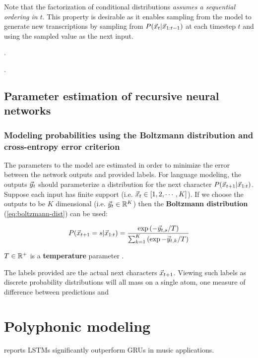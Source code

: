 \documentclass[dissertation.tex]{subfiles}
\begin{document}
Note that the factorization of conditional distributions \emph{assumes a
sequential ordering in $t$}. This property is desirable as it enables sampling
from the model to generate new transcriptions by sampling from $P(\vec{x}_t |
\vec{x}_{1:t-1})$ at each timestep $t$ and using the sampled value as the next
input.

.

.

\subsection{Parameter estimation of recursive neural networks}

\subsubsection{Modeling probabilities using the Boltzmann distribution and cross-entropy error criterion}

The parameters to the model are estimated in order to minimize the error
between the network outputs and provided labels. For language modeling, the
outputs $\vec{y}_t$ should parameterize a distribution for the next character
$P(\vec{x}_{t+1} | \vec{x}_{1:t})$. Suppose each input has finite support (i.e.
$\vec{x}_t \in [1,2,\cdots,K]$). If we choose the outputs to be $K$ dimensional
(i.e. $\vec{y}_t \in \mathbb{R}^K$) then the \textbf{Boltzmann distribution}
(\autoref{eq:boltzmann-dist}) can be used:

\begin{equation}
    \label{eq:boltzmann-dist}
    P(\vec{x}_{t+1} = s | \vec{x}_{1:t})
    = \frac{\exp \left(-\vec{y}_{t,s}/T\right) }{ \sum_{k=1}^{K} \left(\exp -\vec{y}_{t,k}/T\right)}
\end{equation}

$T \in \mathbb{R}^+$ is a \textbf{temperature} parameter .

The labels provided are the actual next characters $\vec{x}_{t+1}$. Viewing
such labels as discrete probability distributions will all mass on a single atom,
one measure of difference between predictions and 

\section{Polyphonic modeling}

\cite{Nayebi2015} reports LSTMs significantly
outperform GRUs in music applications.
\end{document}

